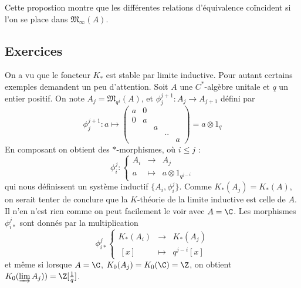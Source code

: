 Cette propostion montre que les différentes relations d'équivalence coïncident si l'on se place dans $\mathfrak M_\infty(A)$.
\subsection{Exercices}

On a vu que le foncteur $K_*$ est stable par limite inductive. Pour autant certains exemples demandent un peu d'attention. Soit $A$ une $C^*$-algèbre unitale et $q$ un entier positif. On note $A_j=\mathfrak M_{q^j}(A)$, et $\phi_j^{j+1}:A_j  \rightarrow  A_{j+1}$ défini par
\[\phi_j^{j+1}: 
a  \mapsto  \begin{pmatrix} a & 0 &   &  &   \\
                              0 & a &   &  &   \\
			        &   & a &  &    \\
				&   &   & ..  &   \\
				&   &   &   & a 
\end{pmatrix}=a \otimes 1_q 
\] 
En composant on obtient des $*$-morphismes, où $i\leq j$ :
\[\phi^j_i :\left\{\begin{array}{lcr}A_i & \rightarrow & A_j \\
 a &\mapsto & a\otimes 1_{q^{j-i}}\end{array}\right.\]
qui nous définissent un système inductif $\{A_i, \phi^j_i\}$. Comme $K_*(A_j)=K_*(A)$, on serait tenter de conclure que la $K$-théorie de la limite inductive est celle de $A$. Il n'en n'est rien comme on peut facilement le voir avec $A=\C$. Les morphismes $\phi_{i*}^j$ sont donnés par la multiplication 
\[\phi_{i*}^j\left\{\begin{array}{lcr} K_*(A_i) & \rightarrow & K_*(A_j)\\
			\ [x]   & \mapsto     &  q^{j-i} [x] \end{array}\right.\]
et même si lorsque $A=\C$, $K_0(A_j)=K_0(\C)=\Z$, on obtient $K_0(\varinjlim A_j))=\Z[\frac{1}{q}]$.
